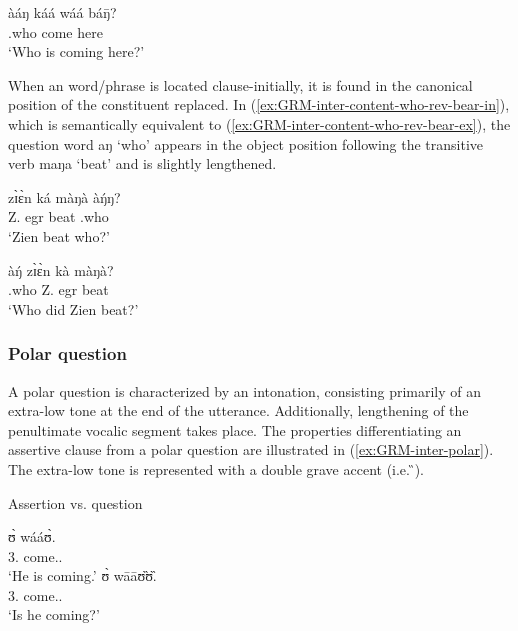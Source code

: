 \ex\label{ex:GRM-inter-content-who}
\gll àáŋ káá wáá báŋ̄?\\
{\q}.who  {\ipfv}  come here\\
\glt  `Who is coming here?'

\z 
 \z
 
When an  word/phrase is located clause-initially,  it is found in the canonical position of the constituent replaced. In (\ref{ex:GRM-inter-content-who-rev-bear-in}), which is semantically equivalent to  (\ref{ex:GRM-inter-content-who-rev-bear-ex}),  the question word {\sls aŋ} `who' appears in the object position following the transitive verb {\sls maŋa} `beat' and is slightly lengthened. 


\ea\label{ex:GRM-inter-content-who-rev-bear}

\begin{multicols}{2}
 \ea\label{ex:GRM-inter-content-who-rev-bear-in}
\gll  zɪ̀ɛ̀n ká màŋà àŋ́ŋ?\\
 Z.  {\sc egr} beat {\q}.who \\
 \glt  `Zien beat who?'

 \ex\label{ex:GRM-inter-content-who-rev-bear-ex}
\gll  àŋ́ zɪ̀ɛ̀n kà màŋà?\\
{\q}.who  Z. {\sc egr} beat\\
 \glt  `Who did Zien beat?'

\z 
\end{multicols}
 \z

 
\subsubsection{Polar question}
\label{sec:GRM-interr-polar}


A polar question is characterized by an  intonation, consisting primarily of an extra-low tone at the end of the utterance. Additionally, lengthening  of the penultimate vocalic segment takes place. The properties differentiating an assertive clause from a polar question are illustrated in (\ref{ex:GRM-inter-polar}). The extra-low tone is represented with a double grave accent (i.e.  ̏).


\ea\label{ex:GRM-inter-polar}{\rm Assertion vs. question}\\

\begin{multicols}{2}
\ea
\gll ʊ̀ wááʊ̀.\\
{3.\sg} come.{\ipfv .\foc}\\
\glt  `He is coming.'
\ex 
\gll ʊ̀ wāāʊ̏ʊ̏.\\
{3.\sg} come.{\ipfv .\q}\\
\glt `Is he coming?'%

\z 
\end{multicols}
 \z
 
